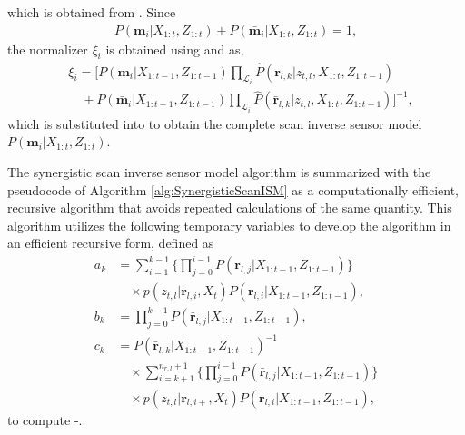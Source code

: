 which is obtained from . Since %
\begin{align*}
P(\mathbf{m}_i|X_{1:t},Z_{1:t})+P(\bar{\mathbf{m}}_i|X_{1:t},Z_{1:t})=1,
\end{align*}
the normalizer $\xi_i$ is obtained using  and  as,
\begin{align}
&\xi_i=
\bigg[
P(\mathbf{m}_i|{X_{1:t-1}},Z_{1:t-1})
\prod_{\mathcal L_i}
\hat P(\mathbf{r}_{l,k}|z_{t,l},{X_{1:t}},Z_{1:t-1})
\nonumber\\&\quad
+
P(\bar{\mathbf{m}}_i|{X_{1:t-1}},Z_{1:t-1})
\prod_{\mathcal L_i}
\hat P(\bar{\mathbf{r}}_{l,k}|z_{t,l},X_{1:t},Z_{1:t-1})
\bigg]^{-1},\label{eqn:xi}
\end{align}
which is substituted into  to obtain the complete scan inverse sensor model $P(\mathbf{m}_i|X_{1:t},Z_{1:t})$. 


The synergistic scan inverse sensor model algorithm is summarized with the pseudocode of Algorithm \ref{alg:SynergisticScanISM} as a computationally efficient, recursive algorithm that avoids repeated calculations of the same quantity. This algorithm utilizes the following temporary variables to develop the algorithm in an efficient recursive form, defined as
\begin{align*}
a_k&=\sum_{i=1}^{k-1}\bigg\{\prod_{j=0}^{i-1}P(\bar{\mathbf{r}}_{l,j}|X_{1:t-1},Z_{1:t-1})\bigg\}\nonumber\\&\quad\times p(z_{t,l}|\mathbf{r}_{l,i},X_t)P(\mathbf{r}_{l,i}|X_{1:t-1},Z_{1:t-1}),
\\
b_k&=\prod_{j=0}^{k-1}P(\bar{\mathbf{r}}_{l,j}|X_{1:t-1},Z_{1:t-1}),
\nonumber\\
c_k&=P(\bar{\mathbf{r}}_{l,k}|X_{1:t-1},Z_{1:t-1})^{-1}
\nonumber\\&\quad\times 
\sum_{i=k+1}^{n_{r,l}+1}\bigg\{\prod_{j=0}^{i-1}P(\bar{\mathbf{r}}_{l,j}|X_{1:t-1},Z_{1:t-1})\bigg\}\nonumber\\&\quad\times p(z_{t,l}|\mathbf{r}_{l,i+},X_t)P(\mathbf{r}_{l,i}|X_{1:t-1},Z_{1:t-1}),
\end{align*}
to compute -.

